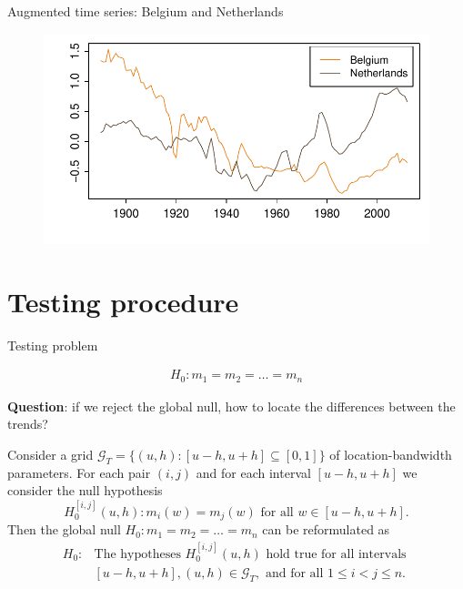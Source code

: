 \documentclass[10pt, handout]{beamer}
\begin{document}
\begin{frame}{Augmented time series: Belgium and Netherlands}
	\begin{figure}
    		\centering
    		\includegraphics[height=0.65\textheight]{plots/hp_BEL_NLD_adj.pdf}
  	\end{figure}	
\end{frame}

\section{Testing procedure}

\begin{frame}{Testing problem}

\begin{align*}
H_0: m_1 = m_2 = \ldots = m_n
\end{align*}\pause

\vspace{-4mm}
\textbf{Question}: if we reject the global null, how to locate the differences between the trends? \pause

Consider a grid $\mathcal{G}_T = \{(u, h): [u-h, u+h] \subseteq [0, 1]\}$ of location-bandwidth parameters. \pause For each pair $(i, j)$ and for each interval $[u-h, u+h]$ we consider the null hypothesis 
\[ H_0^{[i,j]}(u,h): m_i(w) = m_j(w) \text{ for all } w \in [u-h,u+h]. \]\pause
Then the global null $H_0: m_1 = m_2 = \ldots = m_n$ can be reformulated as
\begin{align*}
H_0:  &\text{The hypotheses } H_0^{[i,j]}(u,h) \text{ hold true for all intervals } \\ &[u- h , u+h], (u, h) \in \mathcal{G}_T, \text{ and for all } 1 \le i < j \le n. 
\end{align*} 
\end{frame}
\end{document}
